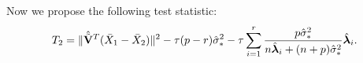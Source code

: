 \documentclass[review]{elsarticle}
\newcommand{\bfsym}[1]{\ensuremath{\boldsymbol{#1}}}
\def\blambda {\bfsym {\lambda}}        \def\bLambda {\bfsym {\Lambda}}
\theoremstyle{plain}
\theoremstyle{definition}
\theoremstyle{remark}
\begin{document}

Now we propose the following test statistic:
$$
T_2=
\|\hat{\tilde{\BV}}^T (\bar{X}_1-\bar{X}_2)\|^2
-
\tau(p-r)\hat{\sigma}_*^2 
- \tau\sum_{i=1}^r \frac{p\hat{\sigma}_*^2}{n\hat{\blambda}_i+(n+p)\hat{\sigma}_*^2}\hat{\blambda}_i.
$$
\end{document}
